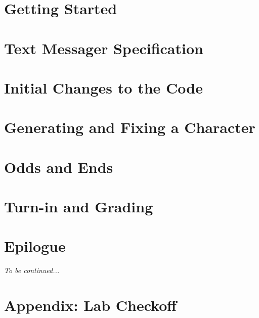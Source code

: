     \section{Getting Started} \label{sec:GettingStarted}                            

    \section{Text Messager Specification} \label{sec:spec}                          

    \section{Initial Changes to the Code} \label{sec:LabTime}                       

    \section{Generating and Fixing a Character} \label{sec:characterGeneration}     

    \section{Odds and Ends} \label{sec:oddsAndEnds}                                 

    \section{Turn-in and Grading}                                                   

    \section*{Epilogue}                                                             \LauraDern

    \textit{To be continued...}

    \appendix

    \section{Appendix: Lab Checkoff}                                                



